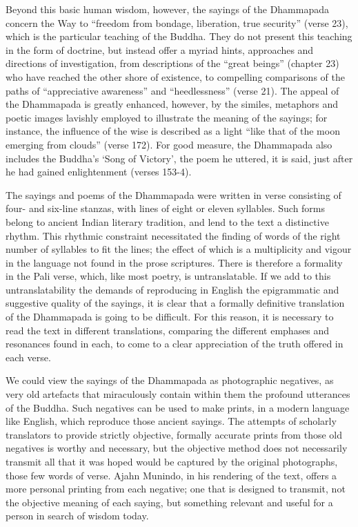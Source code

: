 Beyond this basic human wisdom, however, the sayings of the Dhammapada concern the Way to “freedom from bondage, liberation, true security” (verse 23), which is the particular teaching of the Buddha. They do not present this teaching in the form of doctrine, but instead offer a myriad hints, approaches and directions of investigation, from descriptions of the “great beings” (chapter 23) who have reached the other shore of existence, to compelling comparisons of the paths of “appreciative awareness” and “heedlessness” (verse 21). The appeal of the Dhammapada is greatly enhanced, however, by the similes, metaphors and poetic images lavishly employed to illustrate the meaning of the sayings; for instance, the influence of the wise is described as a light “like that of the moon emerging from clouds” (verse 172). For good measure, the Dhammapada also includes the Buddha’s ‘Song of Victory’, the poem he uttered, it is said, just after he had gained enlightenment (verses 153-4).

The sayings and poems of the Dhammapada were written in verse consisting of four- and six-line stanzas, with lines of eight or eleven syllables. Such forms belong to ancient Indian literary tradition, and lend to the text a distinctive rhythm. This rhythmic constraint necessitated the finding of words of the right number of syllables to fit the lines; the effect of which is a multiplicity and vigour in the language not found in the prose scriptures. There is therefore a formality in the Pali verse, which, like most poetry, is untranslatable. If we add to this untranslatability the demands of reproducing in English the epigrammatic and suggestive quality of the sayings, it is clear that a formally definitive translation of the Dhammapada is going to be difficult. For this reason, it is necessary to read the text in different translations, comparing the different emphases and resonances found in each, to come to a clear appreciation of the truth offered in each verse.

We could view the sayings of the Dhammapada as photographic negatives, as very old artefacts that miraculously contain within them the profound utterances of the Buddha. Such negatives can be used to make prints, in a modern language like English, which reproduce those ancient sayings. The attempts of scholarly translators to provide strictly objective, formally accurate prints from those old negatives is worthy and necessary, but the objective method does not necessarily transmit all that it was hoped would be captured by the original photographs, those few words of verse. Ajahn Munindo, in his rendering of the text, offers a more personal printing from each negative; one that is designed to transmit, not the objective meaning of each saying, but something relevant and useful for a person in search of wisdom today.

